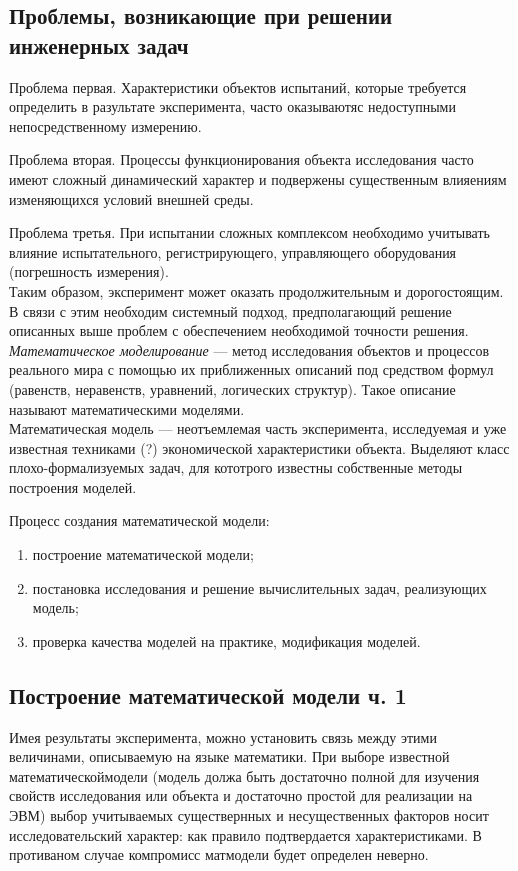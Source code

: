 \documentclass[12pt]{article}
\begin{document}
\subsection{Проблемы, возникающие при решении инженерных задач}
Проблема первая. Характеристики объектов испытаний, которые требуется определить в разультате эксперимента, часто оказываютяс недоступными непосредственному измерению.

Проблема вторая. Процессы функционирования объекта исследования часто имеют сложный динамический характер и подвержены существенным влияениям изменяющихся условий внешней среды.

Проблема третья. При испытании сложных комплексом необходимо учитывать влияние испытательного, регистрирующего, управляющего оборудования (погрешность измерения).\\

Таким образом, эксперимент может оказать продолжительным и дорогостоящим. В связи с этим необходим системный подход, предполагающий решение описанных выше проблем с обеспечением необходимой точности решения.\\

\textit{Математическое моделирование} --- метод исследования объектов и процессов реального мира с помощью их приближенных описаний под средством формул (равенств, неравенств, уравнений, логических структур). Такое описание называют математическими моделями.\\

Математическая модель --- неотъемлемая часть эксперимента, исследуемая и уже известная техниками (?)  экономической характеристики объекта.
Выделяют класс плохо-формализуемых задач, для кототрого известны собственные методы построения моделей.

Процесс создания математической модели:
\begin{enumerate}
    \item построение математической модели;
    \item постановка исследования и решение вычислительных задач, реализующих модель;
    \item проверка качества моделей на практике, модификация моделей.
\end{enumerate}

\subsection{Построение математической модели ч. 1}
Имея результаты эксперимента, можно установить связь между этими величинами, описываемую на языке математики. При выборе известной математическоймодели (модель должа быть достаточно полной для изучения свойств исследования или объекта и достаточно простой для реализации на ЭВМ) выбор учитываемых существернных и несущественных факторов носит исследовательский характер: как правило подтвердается характеристиками. В противаном случае компромисс матмодели будет определен неверно.
\end{document}
